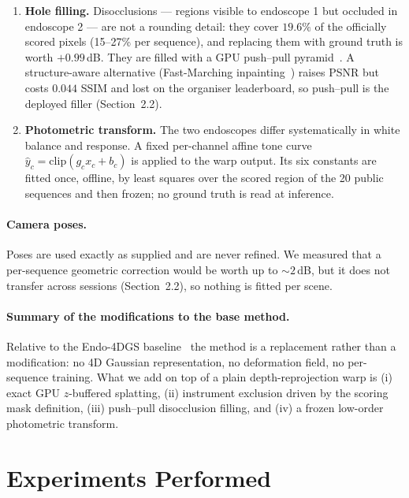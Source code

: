 \begin{enumerate}
        (no blending) and runs entirely on the GPU. Soft/bilinear splatting was tested and is clearly
        worse, because averaging several sources per target pixel injects blur.
  \item \textbf{Hole filling.} Disocclusions --- regions visible to endoscope 1 but occluded in
        endoscope 2 --- are not a rounding detail: they cover $19.6\%$ of the officially scored pixels
        (15--27\% per sequence), and replacing them with ground truth is worth $+0.99$\,dB. They are
        filled with a GPU push--pull pyramid~\cite{gortler1996}. A structure-aware alternative
        (Fast-Marching inpainting~\cite{telea2004}) raises PSNR but costs $0.044$ SSIM and lost on the
        organiser leaderboard, so push--pull is the deployed filler (Section~2.2).
  \item \textbf{Photometric transform.} The two endoscopes differ systematically in white balance and
        response. A fixed per-channel affine tone curve $\hat{y}_c = \mathrm{clip}(g_c x_c + b_c)$ is
        applied to the warp output. Its six constants are fitted once, offline, by least squares over the
        scored region of the 20 public sequences and then frozen; no ground truth is read at inference.
\end{enumerate}

\paragraph{Camera poses.} Poses are used exactly as supplied and are never refined. We measured that a
per-sequence geometric correction would be worth up to $\sim\!2$\,dB, but it does not transfer across
sessions (Section~2.2), so nothing is fitted per scene.

\paragraph{Summary of the modifications to the base method.} Relative to the Endo-4DGS
baseline~\cite{huang2024endo4dgs} the method is a replacement rather than a modification: no 4D Gaussian
representation, no deformation field, no per-sequence training. What we add on top of a plain
depth-reprojection warp is (i) exact GPU $z$-buffered splatting, (ii) instrument exclusion driven by the
scoring mask definition, (iii) push--pull disocclusion filling, and (iv) a frozen low-order photometric
transform.

\section{Experiments Performed}

